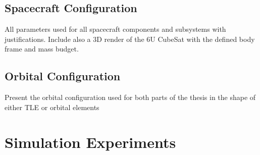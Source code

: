 \subsection{Spacecraft Configuration}
All parameters used for all spacecraft components and subsystems with justifications. Include also a 3D render of the 6U CubeSat with the defined body frame and mass budget. 

\subsection{Orbital Configuration}
Present the orbital configuration used for both parts of the thesis in the shape of either TLE or orbital elements




\section{Simulation Experiments}
